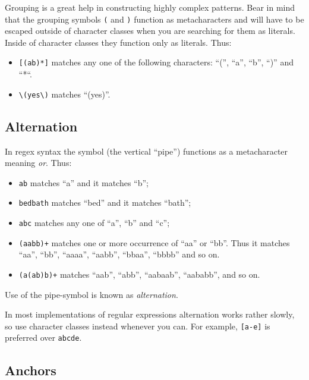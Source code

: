 \documentclass[]{book}
\providecommand{\tightlist}{%
  \setlength{\itemsep}{0pt}\setlength{\parskip}{0pt}}
\theoremstyle{definition}
\theoremstyle{definition}
\theoremstyle{remark}
\begin{document}
{Grouping is a great help in constructing highly complex patterns. Bear
in mind that the grouping symbols \texttt{(} and \texttt{)} function as
metacharacters and will have to be escaped outside of character classes
when you are searching for them as literals. Inside of character classes
they function only as literals. Thus:

\begin{itemize}
\tightlist
\item
  \texttt{{[}(ab)*{]}} matches any one of the following characters:
  ``('', ``a'', ``b'', ``)'' and ``*``.
\item
  \texttt{\textbackslash{}(yes\textbackslash{})} matches ``(yes)''.
\end{itemize}

\subsection{Alternation}\label{alternation}

 In regex syntax the symbol \texttt{\textbar{}} (the
vertical ``pipe'') functions as a metacharacter meaning \emph{or}. Thus:

\begin{itemize}
\tightlist
\item
  \texttt{a\textbar{}b} matches ``a'' and it matches ``b'';
\item
  \texttt{bed\textbar{}bath} matches ``bed'' and it matches ``bath'';
\item
  \texttt{a\textbar{}b\textbar{}c} matches any one of ``a'', ``b'' and
  ``c'';
\item
  \texttt{(aa\textbar{}bb)+} matches one or more occurrence of ``aa'' or
  ``bb''. Thus it matches ``aa'', ``bb'', ``aaaa'', ``aabb'', ``bbaa'',
  ``bbbb'' and so on.
\item
  \texttt{(a(a\textbar{}b)b)+} matches ``aab'', ``abb'', ``aabaab'',
  ``aababb'', and so on.
\end{itemize}

Use of the pipe-symbol is known as \emph{alternation}.

In most implementations of regular expressions alternation works rather
slowly, so use character classes instead whenever you can. For example,
\texttt{{[}a-e{]}} is preferred over
\texttt{a\textbar{}b\textbar{}c\textbar{}d\textbar{}e}.

\subsection{Anchors}\label{anchors}

}
\end{document}
